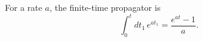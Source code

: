 \documentclass{article}
\begin{document}
For a rate $a$, the finite-time propagator is
\begin{equation}
\int_0^t dt_1\,e^{a t_1}=\frac{e^{a t}-1}{a}.\label{zero-rate}
\end{equation}
\end{document}
